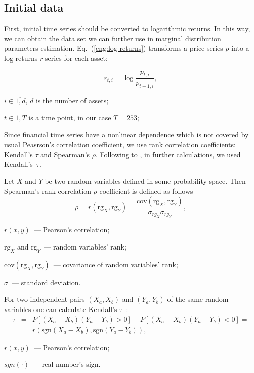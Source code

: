 \subsection*{Initial data}

First, initial time series should be converted to logarithmic returns.
In this way, we can obtain the data set we can further use in marginal distribution parameters estimation.
Eq.~(\ref{eng:log-returns}) transforms a price series $p$ into a log-returns $r$ series for each asset:

\begin{equation}\label{eng:log-returns}
r_{t,i}=\log \frac{p_{t,i}}{p_{t-1,i}},
\end{equation}
\begin{where*}
    \item $i \in \overline{1, d}$, $d$ is the number of assets;
    \item $t\in \overline{1, T}$ is a time point, in our case $T=253$;
\end{where*}

Since financial time series have a nonlinear dependence which is not covered by usual Peasrson's correlation coefficient, we use rank correlation coefficients: Kendall's $\tau$ and Spearman's $\rho$. 
Following to \cite{Dissmann2013}, in further calculations, we used Kendall's~$\tau$.

Let $X$ and $Y$ be two random variables defined in some probability space.
Then Spearman's rank correlation $\rho$ coefficient is defined as follows~\cite{Mye2003}
\begin{equation}\label{eng:spearman}
\rho = r(\text{rg}_X, \text{rg}_Y) = \frac{\text{cov}(\text{rg}_{X},\text{rg}_{Y})}{\sigma_{rg_X} \sigma_{rg_Y}},
\end{equation}
\begin{where*}
    \item $r(x,y)$~--- Pearson's correlation;
    \item $\text{rg}_X$ and $\text{rg}_Y$~--- random variables' rank;
    \item $\text{cov} (\text{rg}_{X}, \text{rg}_{Y})$~--- covariance of random variables' rank;
    \item $\sigma$~--- standard deviation.
\end{where*}

For two independent pairs $(X_a, X_b)$ and $(Y_a, Y_b)$ of the same random variables one can calculate Kendall's $\tau$~\cite{Kendall1970}:
\begin{eqnarray}\label{eng:kendall}
\tau &=& P\left[(X_a-X_b)(Y_a-Y_b)>0\right]-P\left[(X_a-X_b)(Y_a-Y_b)<0\right] = \\ 
&=& r\left(\text{sgn}(X_a-X_b),\text{sgn}(Y_a-Y_b)\right),\nonumber
\end{eqnarray}
\begin{where*}
    \item $r(x,y)$~--- Pearson's correlation;
    \item $sgn(\cdot)$~--- real number's sign.
\end{where*}

